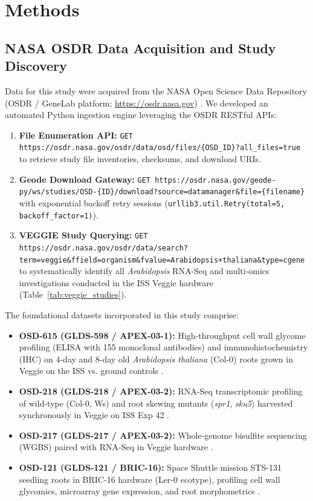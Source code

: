 \section{Methods}

\subsection{NASA OSDR Data Acquisition and Study Discovery}

Data for this study were acquired from the NASA Open Science Data Repository (OSDR / GeneLab platform; \url{https://osdr.nasa.gov}) \cite{Ray2019}. We developed an automated Python ingestion engine leveraging the OSDR RESTful APIs:
\begin{enumerate}
    \item \textbf{File Enumeration API:} \texttt{GET https://osdr.nasa.gov/osdr/data/osd/files/\{OSD\_ID\}?all\_files=true} to retrieve study file inventories, checksums, and download URIs.
    \item \textbf{Geode Download Gateway:} \texttt{GET https://osdr.nasa.gov/geode-py/ws/studies/OSD-\{ID\}/download?source=datamanager\&file=\{filename\}} with exponential backoff retry sessions (\texttt{urllib3.util.Retry(total=5, backoff\_factor=1)}).
    \item \textbf{VEGGIE Study Querying:} \texttt{GET https://osdr.nasa.gov/osdr/data/search?term=veggie\&ffield=organism\&fvalue=Arabidopsis+thaliana\&type=cgene} to systematically identify all \textit{Arabidopsis} RNA-Seq and multi-omics investigations conducted in the ISS Veggie hardware (Table~\ref{tab:veggie_studies}).
\end{enumerate}

The foundational datasets incorporated in this study comprise:
\begin{itemize}
    \item \textbf{OSD-615 (GLDS-598 / APEX-03-1):} High-throughput cell wall glycome profiling (ELISA with 155 monoclonal antibodies) and immunohistochemistry (IHC) on 4-day and 8-day old \textit{Arabidopsis thaliana} (Col-0) roots grown in Veggie on the ISS vs. ground controls \cite{Nakashima2023}.
    \item \textbf{OSD-218 (GLDS-218 / APEX-03-2):} RNA-Seq transcriptomic profiling of wild-type (Col-0, Ws) and root skewing mutants (\textit{spr1}, \textit{sku5}) harvested synchronously in Veggie on ISS Exp 42 \cite{Califar2020}.
    \item \textbf{OSD-217 (GLDS-217 / APEX-03-2):} Whole-genome bisulfite sequencing (WGBS) paired with RNA-Seq in Veggie hardware \cite{Zhou2019}.
    \item \textbf{OSD-121 (GLDS-121 / BRIC-16):} Space Shuttle mission STS-131 seedling roots in BRIC-16 hardware (Ler-0 ecotype), profiling cell wall glycomics, microarray gene expression, and root morphometrics \cite{Paul2012_BRIC16}.
\end{itemize}

